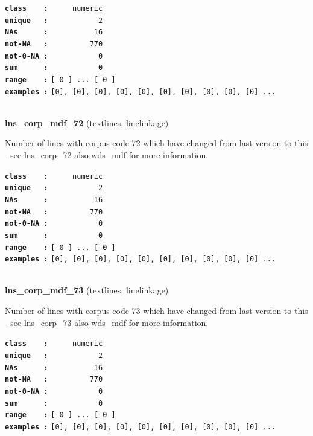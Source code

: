 \documentclass[]{article}
\begin{document}
\textbf{\texttt{class\ \ \ \ :}} \texttt{~~~~~numeric}\\
\textbf{\texttt{unique\ \ \ :}} \texttt{~~~~~~~~~~~2}\\
\textbf{\texttt{NAs\ \ \ \ \ \ :}} \texttt{~~~~~~~~~~16}\\
\textbf{\texttt{not-NA\ \ \ :}} \texttt{~~~~~~~~~770}\\
\textbf{\texttt{not-0-NA\ :}} \texttt{~~~~~~~~~~~0}\\
\textbf{\texttt{sum\ \ \ \ \ \ :}} \texttt{~~~~~~~~~~~0}\\
\textbf{\texttt{range\ \ \ \ :}}
\texttt{{[}\ 0\ {]}\ ...\ {[}\ 0\ {]}}\\
\textbf{\texttt{examples\ :}}
\texttt{{[}0{]},\ {[}0{]},\ {[}0{]},\ {[}0{]},\ {[}0{]},\ {[}0{]},\ {[}0{]},\ {[}0{]},\ {[}0{]},\ {[}0{]}\ ...}\\

~

\textbf{lns\_corp\_mdf\_72} (textlines, linelinkage)

Number of lines with corpus code 72 which have changed from last version
to this - see lns\_corp\_72 also wds\_mdf for more information.

\textbf{\texttt{class\ \ \ \ :}} \texttt{~~~~~numeric}\\
\textbf{\texttt{unique\ \ \ :}} \texttt{~~~~~~~~~~~2}\\
\textbf{\texttt{NAs\ \ \ \ \ \ :}} \texttt{~~~~~~~~~~16}\\
\textbf{\texttt{not-NA\ \ \ :}} \texttt{~~~~~~~~~770}\\
\textbf{\texttt{not-0-NA\ :}} \texttt{~~~~~~~~~~~0}\\
\textbf{\texttt{sum\ \ \ \ \ \ :}} \texttt{~~~~~~~~~~~0}\\
\textbf{\texttt{range\ \ \ \ :}}
\texttt{{[}\ 0\ {]}\ ...\ {[}\ 0\ {]}}\\
\textbf{\texttt{examples\ :}}
\texttt{{[}0{]},\ {[}0{]},\ {[}0{]},\ {[}0{]},\ {[}0{]},\ {[}0{]},\ {[}0{]},\ {[}0{]},\ {[}0{]},\ {[}0{]}\ ...}\\

~

\textbf{lns\_corp\_mdf\_73} (textlines, linelinkage)

Number of lines with corpus code 73 which have changed from last version
to this - see lns\_corp\_73 also wds\_mdf for more information.

\textbf{\texttt{class\ \ \ \ :}} \texttt{~~~~~numeric}\\
\textbf{\texttt{unique\ \ \ :}} \texttt{~~~~~~~~~~~2}\\
\textbf{\texttt{NAs\ \ \ \ \ \ :}} \texttt{~~~~~~~~~~16}\\
\textbf{\texttt{not-NA\ \ \ :}} \texttt{~~~~~~~~~770}\\
\textbf{\texttt{not-0-NA\ :}} \texttt{~~~~~~~~~~~0}\\
\textbf{\texttt{sum\ \ \ \ \ \ :}} \texttt{~~~~~~~~~~~0}\\
\textbf{\texttt{range\ \ \ \ :}}
\texttt{{[}\ 0\ {]}\ ...\ {[}\ 0\ {]}}\\
\textbf{\texttt{examples\ :}}
\texttt{{[}0{]},\ {[}0{]},\ {[}0{]},\ {[}0{]},\ {[}0{]},\ {[}0{]},\ {[}0{]},\ {[}0{]},\ {[}0{]},\ {[}0{]}\ ...}\\
\end{document}
